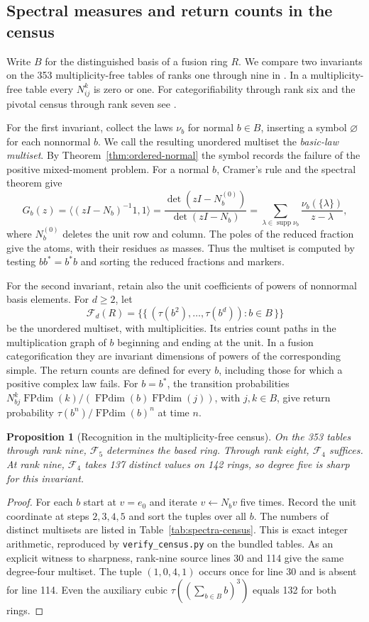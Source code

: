 \documentclass[11pt,reqno]{amsart}
\newtheorem{proposition}[theorem]{Proposition}
\theoremstyle{definition}
\newcommand{\FPdim}{\operatorname{FPdim}}
\DeclareMathOperator{\supp}{supp}
\begin{document}
\subsection{Spectral measures and return counts in the census}\label{sec:census}
Write $B$ for the distinguished basis of a fusion ring $R$. We compare two invariants on the 353 multiplicity-free tables of ranks one through nine in \cite{Census,VSrings}. In a multiplicity-free table every $N_{ij}^k$ is zero or one. For categorifiability through rank six and the pivotal census through rank seven see \cite{LPR,VScategories}.

For the first invariant, collect the laws $\nu_b$ for normal $b\in B$, inserting a symbol $\varnothing$ for each nonnormal $b$. We call the resulting unordered multiset the \emph{basic-law multiset}. By Theorem~\ref{thm:ordered-normal} the symbol records the failure of the positive mixed-moment problem. For a normal $b$, Cramer's rule and the spectral theorem give
\[
 G_b(z)=\big\langle(zI-N_b)^{-1}1,1\big\rangle
 =\frac{\det(zI-N_b^{(0)})}{\det(zI-N_b)}
 =\sum_{\lambda\in\supp\nu_b}\frac{\nu_b(\{\lambda\})}{z-\lambda},
\]
where $N_b^{(0)}$ deletes the unit row and column. The poles of the reduced fraction give the atoms, with their residues as masses. Thus the multiset is computed by testing $bb^*=b^*b$ and sorting the reduced fractions and markers.

For the second invariant, retain also the unit coefficients of powers of nonnormal basis elements. For $d\geq2$, let
\[
   \mathcal F_d(R)=
      \bigl\{\!\bigl\{\,(\tau(b^2),\ldots,\tau(b^d)):b\in B\,\bigr\}\!\bigr\}
\]
be the unordered multiset, with multiplicities. Its entries count paths in the multiplication graph of $b$ beginning and ending at the unit. In a fusion categorification they are invariant dimensions of powers of the corresponding simple. The return counts are defined for every $b$, including those for which a positive complex law fails. For $b=b^*$, the transition probabilities $N_{bj}^k\FPdim(k)/(\FPdim(b)\FPdim(j))$, with $j,k\in B$, give return probability $\tau(b^n)/\FPdim(b)^n$ at time $n$.

\begin{proposition}[Recognition in the multiplicity-free census]\label{thm:census-return}
On the 353 tables through rank nine, $\mathcal F_5$ determines the based ring. Through rank eight, $\mathcal F_4$ suffices. At rank nine, $\mathcal F_4$ takes 137 distinct values on 142 rings, so degree five is sharp for this invariant.
\end{proposition}
\begin{proof}
For each $b$ start at $v=e_0$ and iterate $v\leftarrow N_bv$ five times. Record the unit coordinate at steps $2,3,4,5$ and sort the tuples over all $b$. The numbers of distinct multisets are listed in Table~\ref{tab:spectra-census}. This is exact integer arithmetic, reproduced by \texttt{verify\_census.py} on the bundled tables. As an explicit witness to sharpness, rank-nine source lines 30 and 114 give the same degree-four multiset. The tuple $(1,0,4,1)$ occurs once for line 30 and is absent for line 114. Even the auxiliary cubic $\tau((\sum_{b\in B}b)^3)$ equals 132 for both rings.
\end{proof}
\end{document}
